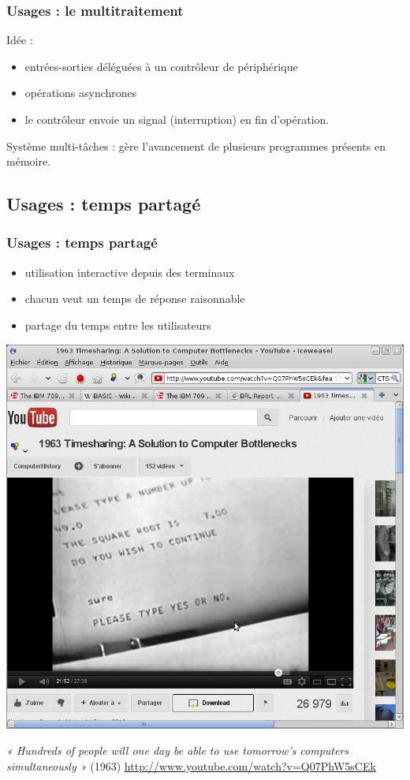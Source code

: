 \documentclass{beamer}
\begin{document}
\begin{frame}
\frametitle{Usages : le multitraitement}

Idée :
\begin{itemize}
\item entrées-sorties 
déléguées à un \alert{contrôleur de périphérique}
\item opérations \alert{asynchrones}
\item le contrôleur envoie un signal (\alert{interruption}) en fin d'opération.
\end{itemize}
\vfill 
\alert{Système multi-tâches} : gère l'avancement de plusieurs programmes
présents en mémoire.
\end{frame}

\subsection{Usages : temps partagé}

\begin{frame}
\frametitle{Usages : temps partagé}

\begin{multicols}{2}
\begin{itemize}
\item utilisation interactive depuis des terminaux
\item chacun  veut un temps de réponse raisonnable
\item partage du temps entre les utilisateurs
\end{itemize}
\begin{center}
\includegraphics[width=.8\linewidth]{Videos/corbato-demo.png}
\end{center}



\end{multicols}
\emph{
« Hundreds of people will one day be able to use tomorrow's computers simultaneously »} (1963)
\url{http://www.youtube.com/watch?v=Q07PhW5sCEk}
\end{frame}
\end{document}
